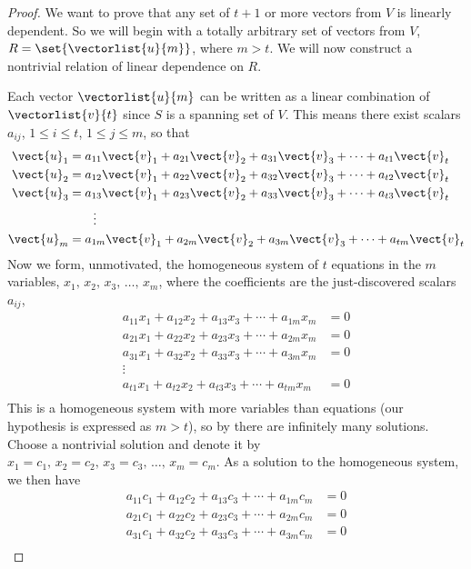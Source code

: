 \begin{proof}
We want to prove that any set of $t+1$ or more vectors from $V$ is linearly dependent.  So we will begin with a totally arbitrary set of vectors from $V$, $R=\set{\vectorlist{u}{m}}$, where $m>t$.  We will now construct a nontrivial relation of linear dependence on $R$.\par
%
Each vector $\vectorlist{u}{m}$ can be written as a linear combination of $\vectorlist{v}{t}$ since $S$ is a spanning set of $V$.  This means there exist scalars  $a_{ij}$, $1\leq i\leq t$, $1\leq j\leq m$, so that
%
\begin{align*}
\vect{u}_1&=a_{11}\vect{v}_1+a_{21}\vect{v}_2+a_{31}\vect{v}_3+\cdots+a_{t1}\vect{v}_t\\
\vect{u}_2&=a_{12}\vect{v}_1+a_{22}\vect{v}_2+a_{32}\vect{v}_3+\cdots+a_{t2}\vect{v}_t\\
\vect{u}_3&=a_{13}\vect{v}_1+a_{23}\vect{v}_2+a_{33}\vect{v}_3+\cdots+a_{t3}\vect{v}_t\\
&\quad\quad\vdots\\
\vect{u}_m&=a_{1m}\vect{v}_1+a_{2m}\vect{v}_2+a_{3m}\vect{v}_3+\cdots+a_{tm}\vect{v}_t
\end{align*}
%
Now we form, unmotivated, the homogeneous system of $t$ equations in the $m$ variables, $x_1,\,x_2,\,x_3,\,\ldots,\,x_m$, where the coefficients are the just-discovered scalars $a_{ij}$,
%
\begin{align*}
a_{11}x_1+a_{12}x_2+a_{13}x_3+\cdots+a_{1m}x_m&=0\\
a_{21}x_1+a_{22}x_2+a_{23}x_3+\cdots+a_{2m}x_m&=0\\
a_{31}x_1+a_{32}x_2+a_{33}x_3+\cdots+a_{3m}x_m&=0\\
\vdots\quad\quad&\\
a_{t1}x_1+a_{t2}x_2+a_{t3}x_3+\cdots+a_{tm}x_m&=0\\
\end{align*}
%
This is a homogeneous system with more variables than equations (our hypothesis is expressed as $m>t$), so by  there are infinitely many solutions.  Choose a nontrivial solution and denote it by $x_1=c_1,\,x_2=c_2,\,x_3=c_3,\,\ldots,\,x_m=c_m$.  As a solution to the homogeneous system, we then have 
%
\begin{align*}
a_{11}c_1+a_{12}c_2+a_{13}c_3+\cdots+a_{1m}c_m&=0\\
a_{21}c_1+a_{22}c_2+a_{23}c_3+\cdots+a_{2m}c_m&=0\\
a_{31}c_1+a_{32}c_2+a_{33}c_3+\cdots+a_{3m}c_m&=0\\

\end{align*}
\end{proof}
